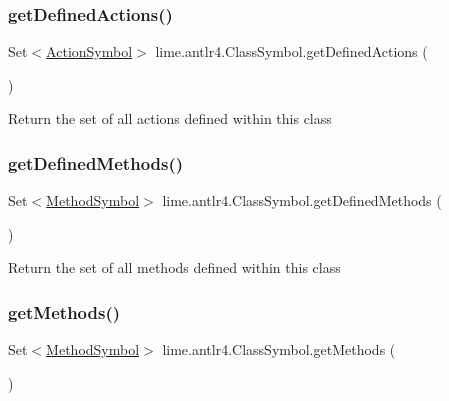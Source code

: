 \subsubsection{\texorpdfstring{get\+Defined\+Actions()}{getDefinedActions()}}
{\footnotesize\ttfamily Set$<$\hyperlink{classlime_1_1antlr4_1_1ActionSymbol}{Action\+Symbol}$>$ lime.\+antlr4.\+Class\+Symbol.\+get\+Defined\+Actions (\begin{DoxyParamCaption}{ }\end{DoxyParamCaption})}

Return the set of all actions defined within this class \mbox{\label{classlime_1_1antlr4_1_1ClassSymbol_aefa7b605f712bc843830b4e66d547962}} 
\subsubsection{\texorpdfstring{get\+Defined\+Methods()}{getDefinedMethods()}}
{\footnotesize\ttfamily Set$<$\hyperlink{classlime_1_1antlr4_1_1MethodSymbol}{Method\+Symbol}$>$ lime.\+antlr4.\+Class\+Symbol.\+get\+Defined\+Methods (\begin{DoxyParamCaption}{ }\end{DoxyParamCaption})}

Return the set of all methods defined within this class \mbox{\label{classlime_1_1antlr4_1_1ClassSymbol_a0bb56898dfcbdc91a1f81151524b54f5}} 
\subsubsection{\texorpdfstring{get\+Methods()}{getMethods()}}
{\footnotesize\ttfamily Set$<$\hyperlink{classlime_1_1antlr4_1_1MethodSymbol}{Method\+Symbol}$>$ lime.\+antlr4.\+Class\+Symbol.\+get\+Methods (\begin{DoxyParamCaption}{ }\end{DoxyParamCaption})}

